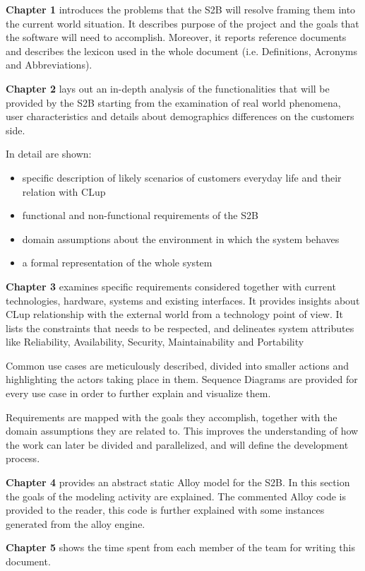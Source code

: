 \textbf{Chapter 1} introduces the problems that the S2B will resolve framing them into the current world situation. It describes purpose of the project and the goals that the software will need to accomplish. Moreover, it reports reference documents and describes the lexicon used in the whole document (i.e. Definitions, Acronyms and Abbreviations).

\textbf{Chapter 2} lays out an in-depth analysis of the functionalities that will be provided by the S2B starting from the examination of real world phenomena, user characteristics and details about demographics differences on the customers side.

In detail are shown:
\begin{itemize}
      \item specific description of likely scenarios of customers everyday life and their relation with CLup
      \item functional and non-functional requirements of the S2B
      \item domain assumptions about the environment in which the system behaves
      \item a formal representation of the whole system
\end{itemize}

\textbf{Chapter 3} examines specific requirements considered together with current technologies, hardware, systems and existing interfaces. It provides insights about CLup relationship with the external world from a technology point of view. It lists the constraints that needs to be respected, and delineates system attributes like Reliability, Availability, Security, Maintainability and Portability

Common use cases are meticulously described, divided into smaller actions and highlighting the actors taking place in them. Sequence Diagrams are provided for every use case in order to further explain and visualize them.

Requirements are mapped with the goals they accomplish, together with the domain assumptions they are related to. This improves the understanding of how the work can later be divided and parallelized, and will define the development process.


\textbf{Chapter 4} provides an abstract static Alloy model for the S2B. In this section the goals of the modeling activity are explained. The commented Alloy code is provided to the reader, this code is further explained with some instances generated from the alloy engine.

\textbf{Chapter 5} shows the time spent from each member of the team for writing this document.